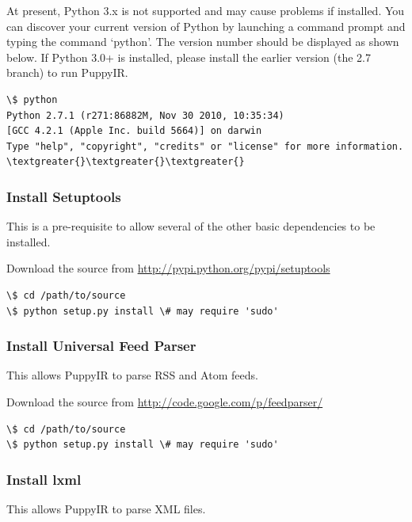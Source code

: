 \documentclass[letterpaper,10pt,english]{sphinxmanual}
\begin{document}
At present, Python 3.x is not supported and may cause problems if installed.  You can discover your current version of Python by launching a command prompt and typing the command `python'.  The version number should be displayed as shown below. If Python 3.0+ is installed, please install the earlier version (the 2.7 branch) to run PuppyIR.

\begin{Verbatim}[commandchars=\\\{\}]
\$ python
Python 2.7.1 (r271:86882M, Nov 30 2010, 10:35:34)
[GCC 4.2.1 (Apple Inc. build 5664)] on darwin
Type "help", "copyright", "credits" or "license" for more information.
\textgreater{}\textgreater{}\textgreater{}
\end{Verbatim}


\subsubsection{Install Setuptools}
\label{installation:install-setuptools}
This is a pre-requisite to allow several of the other basic dependencies to be installed.

Download the source from \href{http://pypi.python.org/pypi/setuptools}{http://pypi.python.org/pypi/setuptools}

\begin{Verbatim}[commandchars=\\\{\}]
\$ cd /path/to/source
\$ python setup.py install \# may require 'sudo'
\end{Verbatim}


\subsubsection{Install Universal Feed Parser}
\label{installation:install-universal-feed-parser}
This allows PuppyIR to parse RSS and Atom feeds.

Download the source from \href{http://code.google.com/p/feedparser/}{http://code.google.com/p/feedparser/}

\begin{Verbatim}[commandchars=\\\{\}]
\$ cd /path/to/source
\$ python setup.py install \# may require 'sudo'
\end{Verbatim}


\subsubsection{Install lxml}
\label{installation:install-lxml}
This allows PuppyIR to parse XML files.
\end{document}

